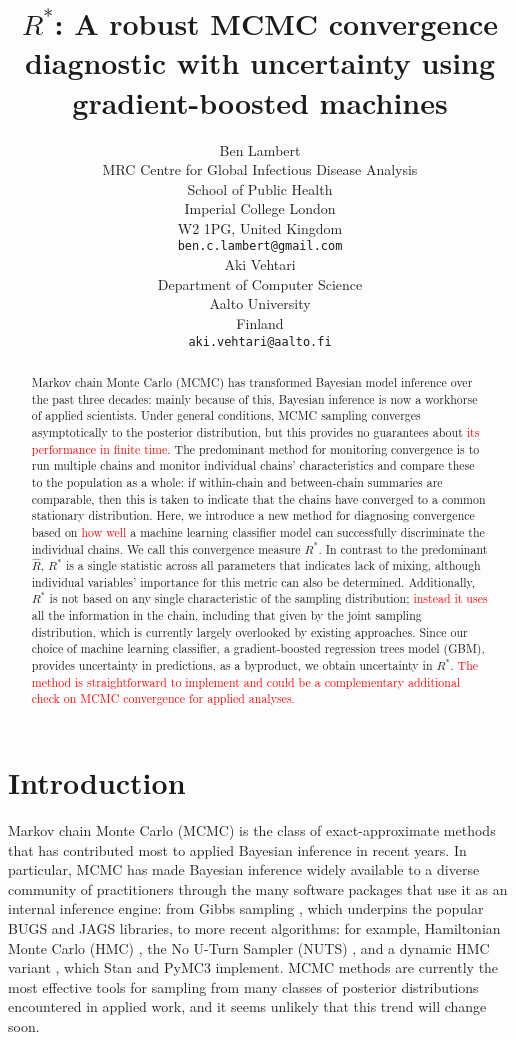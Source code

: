 \documentclass{article}
\title{$R^*$: A robust MCMC convergence diagnostic with uncertainty using gradient-boosted machines}
\author{%
	 Ben Lambert\\
	 MRC Centre for Global Infectious Disease Analysis\\
	 School of Public Health\\
	 Imperial College London\\
	 W2 1PG, United Kingdom\\
	 \texttt{ben.c.lambert@gmail.com} \\
	 \And
	 Aki Vehtari \\
	 Department of Computer Science\\
	 Aalto University\\
	 Finland\\
	 \texttt{aki.vehtari@aalto.fi}
}
\begin{document}

\maketitle

\begin{abstract}
	Markov chain Monte Carlo (MCMC) has transformed Bayesian model inference over the past three decades: mainly because of this, Bayesian inference is now a workhorse of applied scientists. Under general conditions, MCMC sampling converges asymptotically to the posterior distribution, but this provides no guarantees about \textcolor{red}{its performance in finite time}. The predominant method for monitoring convergence is to run multiple chains and monitor individual chains' characteristics and compare these to the population as a whole: if within-chain and between-chain summaries are comparable, then this is taken to indicate that the chains have converged to a common stationary distribution. Here, we introduce a new method for diagnosing convergence based on \textcolor{red}{how well} a machine learning classifier model can successfully discriminate the individual chains. We call this convergence measure $R^*$. In contrast to the predominant $\widehat{R}$, $R^*$ is a single statistic across all parameters that indicates lack of mixing, although individual variables' importance for this metric can also be determined. Additionally, $R^*$ is not based on any single characteristic of the sampling distribution; \textcolor{red}{instead it uses} all the information in the chain, including that given by the joint sampling distribution, which is currently largely overlooked by existing approaches. Since our choice of machine learning classifier, a gradient-boosted regression trees model (GBM), provides uncertainty in predictions, as a byproduct, we obtain uncertainty in $R^*$. \textcolor{red}{The method is straightforward to implement and could be a complementary additional check on MCMC convergence for applied analyses.}
\end{abstract}

\section{Introduction}
Markov chain Monte Carlo (MCMC) is the class of exact-approximate methods that has contributed most to applied Bayesian inference in recent years. In particular, MCMC has made Bayesian inference widely available to a diverse community of practitioners through the many software packages that use it as an internal inference engine: from Gibbs sampling \citep{geman1984stochastic}, which underpins the popular BUGS \citep{lunn2000winbugs} and JAGS \citep{plummer2003jags} libraries, to more recent algorithms: for example, Hamiltonian Monte Carlo (HMC) \citep{neal2011mcmc}, the No U-Turn Sampler (NUTS) \citep{hoffman2014no}, and a dynamic HMC variant \citep{betancourt2017conceptual}, which Stan \citep{carpenter2017stan} and PyMC3 \citep{salvatier2016probabilistic} implement. MCMC methods are currently the most effective tools for sampling from many classes of posterior distributions encountered in applied work, and it seems unlikely that this trend will change soon.
\end{document}
